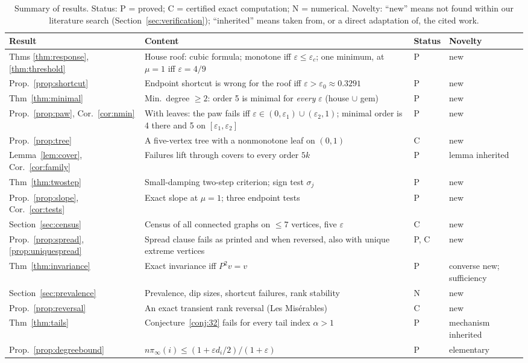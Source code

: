\documentclass[11pt,a4paper]{article}
\theoremstyle{definition}\newtheorem{conjecture}{Conjecture}
\theoremstyle{remark}\newtheorem{remark}[theorem]{Remark}
\newcommand{\eps}{\varepsilon}
\begin{document}
\begin{table}[htbp]
\centering\small
\caption{Summary of results. Status: P = proved; C = certified exact computation; N = numerical. Novelty: ``new'' means not found within our literature search (Section~\ref{sec:verification}); ``inherited'' means taken from, or a direct adaptation of, the cited work.}\label{tab:summary}
\setlength{\tabcolsep}{4pt}\begin{tabularx}{\textwidth}{@{}>{\raggedright\arraybackslash}p{2.9cm}X>{\centering\arraybackslash}p{1.1cm}>{\raggedright\arraybackslash}p{1.9cm}@{}}
\toprule
Result & Content & Status & Novelty\\
\midrule
Thms \ref{thm:response}, \ref{thm:threshold} & House roof: cubic formula; monotone iff $\eps\leq\eps_c$; one minimum, at $\mu=1$ iff $\eps=4/9$ & P & new\\
Prop.~\ref{prop:shortcut} & Endpoint shortcut is wrong for the roof iff $\eps>\eps_0\approx0.3291$ & P & new\\
Thm~\ref{thm:minimal} & Min.\ degree $\geq2$: order 5 is minimal for \emph{every} $\eps$ (house $\cup$ gem) & P & new\\
Prop.~\ref{prop:paw}, Cor.~\ref{cor:nmin} & With leaves: the paw fails iff $\eps\in(0,\eps_1)\cup(\eps_2,1)$; minimal order is 4 there and 5 on $[\eps_1,\eps_2]$ & P & new\\
Prop.~\ref{prop:tree} & A five-vertex tree with a nonmonotone leaf on $(0,1)$ & C & new\\
Lemma~\ref{lem:cover}, Cor.~\ref{cor:family} & Failures lift through covers to every order $5k$ & P & lemma inherited \cite{boldifib}\\
Thm~\ref{thm:twostep} & Small-damping two-step criterion; sign test $\sigma_j$ & P & new\\
Prop.~\ref{prop:slope}, Cor.~\ref{cor:tests} & Exact slope at $\mu=1$; three endpoint tests & P & new\\
Section~\ref{sec:census} & Census of all connected graphs on $\leq7$ vertices, five $\eps$ & C & new\\
Prop.~\ref{prop:spread}, \ref{prop:uniquespread} & Spread clause fails as printed and when reversed, also with unique extreme vertices & P, C & new\\
Thm~\ref{thm:invariance} & Exact invariance iff $P^2v=v$ & P & converse new; sufficiency \cite{arrigo,glover}\\
Section~\ref{sec:prevalence} & Prevalence, dip sizes, shortcut failures, rank stability & N & new\\
Prop.~\ref{prop:reversal} & An exact transient rank reversal (Les Mis\'erables) & C & new\\
Thm~\ref{thm:tails} & Conjecture~\ref{conj:32} fails for every tail index $\alpha>1$ & P & mechanism inherited \cite{henning}\\
Prop.~\ref{prop:degreebound} & $n\pi_\infty(i)\leq(1+\eps d_i/2)/(1+\eps)$ & P & elementary\\
\bottomrule
\end{tabularx}
\end{table}
\end{document}

